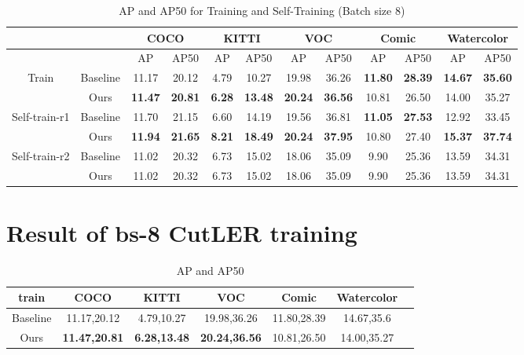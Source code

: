 \begin{table}[htbp]
	\centering
	\begin{tabular}{c|c|cc|cc|cc|cc|cc}
		\toprule
		& & \multicolumn{2}{c|}{COCO} & \multicolumn{2}{c|}{KITTI} & \multicolumn{2}{c|}{VOC} & \multicolumn{2}{c|}{Comic} & \multicolumn{2}{c}{Watercolor} \\ \midrule
		& & AP & AP50 & AP & AP50 & AP & AP50 & AP & AP50 & AP & AP50 \\ \midrule
		\multirow{2}{*}{Train} & Baseline & 11.17 & 20.12 & 4.79 & 10.27 & 19.98 & 36.26 & \textbf{11.80} & \textbf{28.39} & \textbf{14.67} & \textbf{35.60} \\ 
		& Ours & \textbf{11.47} & \textbf{20.81} & \textbf{6.28} & \textbf{13.48} & \textbf{20.24} & \textbf{36.56} & 10.81 & 26.50 & 14.00 & 35.27 \\ \midrule
		\multirow{2}{*}{Self-train-r1} & Baseline & 11.70 & 21.15 & 6.60 & 14.19 & 19.56 & 36.81 & \textbf{11.05} & \textbf{27.53} & 12.92 & 33.45 \\ 
		& Ours & \textbf{11.94} & \textbf{21.65} & \textbf{8.21} & \textbf{18.49} & \textbf{20.24} & \textbf{37.95} & 10.80 & 27.40 & \textbf{15.37} & \textbf{37.74} \\ \midrule
		\multirow{2}{*}{Self-train-r2} & Baseline & 11.02 & 20.32 & 6.73 & 15.02 & 18.06 & 35.09 & 9.90 & 25.36 & 13.59 & 34.31 \\ 
		& Ours & 11.02 & 20.32 & 6.73 & 15.02 & 18.06 & 35.09 & 9.90 & 25.36 & 13.59 & 34.31 \\ \bottomrule
	\end{tabular}
	\caption{AP and AP50 for Training and Self-Training (Batch size 8)}
	\label{tab:combined_train_1}
\end{table}



\section{Result of bs-8 CutLER training}

\cite{wang2023cut}
\begin{table}[htbp]
	\centering
	\begin{tabular}{c|c|c|c|c|cl}
		\toprule
		train & COCO & KITTI & VOC & Comic & Watercolor \\ \midrule
		Baseline & 11.17,20.12 & 4.79,10.27 & 19.98,36.26 & 11.80,28.39 & 14.67,35.6 \\ \midrule
		Ours & \textbf{11.47,20.81} & \textbf{6.28,13.48} & \textbf{20.24,36.56} & 10.81,26.50 & 14.00,35.27 \\ \bottomrule
	\end{tabular}
	\caption{AP and AP50}
	\label{tab:base_train}
\end{table}

